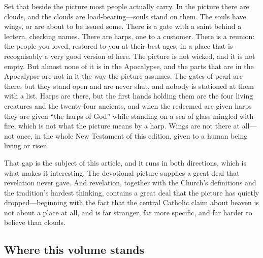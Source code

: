 Set that beside the picture most people actually carry. In the picture there are clouds, and the clouds are load-bearing---souls stand on them. The souls have wings, or are about to be issued some. There is a gate with a saint behind a lectern, checking names. There are harps, one to a customer. There is a reunion: the people you loved, restored to you at their best ages, in a place that is recognisably a very good version of here. The picture is not wicked, and it is not empty. But almost none of it is in the Apocalypse, and the parts that are in the Apocalypse are not in it the way the picture assumes. The gates of pearl are there, but they stand open and are never shut, and nobody is stationed at them with a list. Harps are there, but the first hands holding them are the four living creatures and the twenty-four ancients, and when the redeemed are given harps they are given ``the harps of God'' while standing on a sea of glass mingled with fire, which is not what the picture means by a harp. Wings are not there at all---not once, in the whole New Testament of this edition, given to a human being living or risen.

That gap is the subject of this article, and it runs in both directions, which is what makes it interesting. The devotional picture supplies a great deal that revelation never gave. And revelation, together with the Church's definitions and the tradition's hardest thinking, contains a great deal that the picture has quietly dropped---beginning with the fact that the central Catholic claim about heaven is not about a place at all, and is far stranger, far more specific, and far harder to believe than clouds.

\subsection{Where this volume stands}

